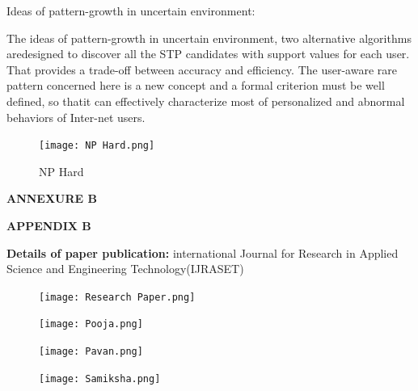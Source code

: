 \documentclass[12pt]{report}
\begin{document}
Ideas of pattern-growth in uncertain environment:

The ideas of pattern-growth in uncertain environment, two alternative algorithms aredesigned to 
discover all the STP candidates with support values for each user. That provides a trade-off 
between accuracy and efficiency. The user-aware rare pattern concerned here is a new concept 
and a formal criterion must be well defined, so thatit can effectively characterize most of
personalized and abnormal behaviors of Inter-net users.

\begin{figure}[h]
\centering
\texttt{[image: NP Hard.png]}
\caption{NP Hard}
\label{NP Hard
}
\end{figure}

\vspace{1cm}




\centering
\Large\textbf{ANNEXURE B}

\centering

\Large\textbf{APPENDIX B}\\
\justifying
\setlength{\parindent}{4em}
\setlength{\parskip}{0.5em}
\renewcommand{\baselinestretch}{1.5}
\normalsize
\raggedright\textbf{Details of paper publication:} international Journal for Research in Applied Science and Engineering Technology(IJRASET)

\begin{figure}[h]
\centering
\texttt{[image: Research Paper.png]}

\end{figure}

\vspace{1cm}

\begin{figure}[h]
\centering
\texttt{[image: Pooja.png]}

\end{figure}

\vspace{0.1cm} 



\begin{figure}[h]
\centering
\texttt{[image: Pavan.png]}

\end{figure}

\vspace{1cm}

\begin{figure}[h]
\centering
\texttt{[image: Samiksha.png]}

\end{figure}
\end{document}
